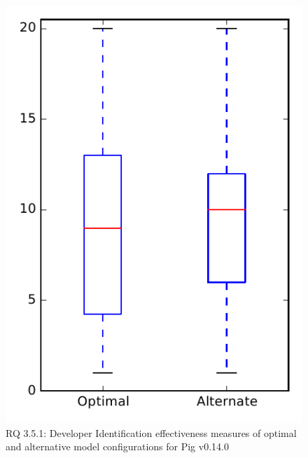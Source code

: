 
\begin{figure}
\centering
\includegraphics[height=0.4\textheight]{figures/combo/dit_rq1_pig}
\caption{RQ 3.5.1: Developer Identification effectiveness measures of optimal and alternative model configurations for Pig v0.14.0}
\label{fig:combo:dit:rq1:pig}
\end{figure}
